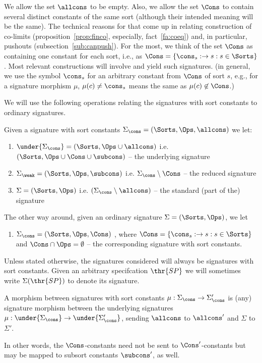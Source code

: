 We allow the set $\allcons$ to be empty. Also, we allow the set
$\Cons$ to contain several distinct constants of the same sort (although
their intended meaning will be the same).
The technical reasons for that come up in relating construction of co-limits
(proposition~\ref{prop:finco}, especially, fact~\ref{fa:coeq}) and, in particular, pushouts
(subsection~\ref{sub:canpush}). For the most, we think of the set
$\Cons$ as containing one constant for each sort, i.e., as
$\Cons=\{\cons_s:\to s : s\in\Sorts\}$. Most relevant constructions will
involve and yield such signatures. (in general, we use the symbol $\cons_s$
for an arbitrary constant from $\Cons$ of sort $s$, e.g., for a signature
morphism $\mu$, 
$\mu(c)\not=\cons_s$ means the same as $\mu(c)\not\in\Cons$.)


We will use the following operations relating the signatures with sort
 constants to ordinary signatures.

\begin{definition}\label{def:sigops}
Given a signature with sort constants $\Sigma_\cons=(\Sorts,\Ops,\allcons)$ we let:
\begin{enumerate}\MyLPar
\item $\under{\Sigma_\cons}=(\Sorts,\Ops \cup \allcons)$
i.e. $(\Sorts, \Ops \cup \Cons \cup \subcons)$ -- the underlying signature
\item ${\Sigma_\weak}=(\Sorts,\Ops,\subcons)$ i.e. $\Sigma_\cons
\setminus \Cons$ -- the reduced signature
\item ${\Sigma}=(\Sorts,\Ops)$ i.e. $(\Sigma_\cons
\setminus \allcons)$ -- the standard (part of the) signature
\end{enumerate}
The other way around, given an ordinary signature $\Sigma=(\Sorts,\Ops)$, we let
\begin{enumerate}\MyLPar\setcounter{enumi}{3}
\item ${\Sigma_\cons}=(\Sorts,\Ops,\Cons)$
, where   $\Cons=\{\cons_s:\to s:s\in\Sorts\}$ and $\Cons\cap\Ops=\emptyset$
-- the corresponding signature with sort constants.
\end{enumerate}
\end{definition}
%
Unless stated otherwise, the signatures considered will always be signatures with sort constants. 
Given an arbitrary specifcation $\thr{SP}$ we will sometimes write
$\Sigma(\thr{SP})$ to denote its signature.

\begin{definition}
A morphism between signatures with sort constants $\mu:\Sigma_\cons \to
\Sigma'_{\cons}$ is (any) signature morphism between the underlying
signatures $\mu:\under{\Sigma_\cons}\to\under{\Sigma'_\cons}$, sending
$\allcons$ to ${\allcons}'$ and $\Sigma$ to $\Sigma'$.
\end{definition}
In other words, the $\Cons$-constants need not be sent to $\Cons'$-constants
but may be mapped to subsort constants ${\subcons}'$, as well.

